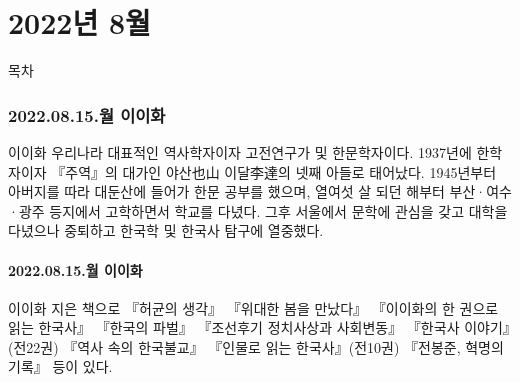\documentclass[aspectratio=1610,17pt,xcolor=pdftex,dvipsnames,table,handout]{beamer}
\begin{document}
		\part{2022년 8월}
		\frame{\partpage}


		\begin{frame} [plain]{목차}
		\tableofcontents
		\end{frame}
		


		\section{2022.08.15.월  이이화 }
		

		\begin{frame} [t,plain]
			\begin{block} {이이화}
우리나라 대표적인 역사학자이자 고전연구가 및 한문학자이다. 1937년에 한학자이자 『주역』의 대가인 야산也山 이달李達의 넷째 아들로 태어났다. 1945년부터 아버지를 따라 대둔산에 들어가 한문 공부를 했으며, 열여섯 살 되던 해부터 부산·여수·광주 등지에서 고학하면서 학교를 다녔다. 그후 서울에서 문학에 관심을 갖고 대학을 다녔으나 중퇴하고 한국학 및 한국사 탐구에 열중했다.
			\end{block}
		\end{frame}

		\subsection{2022.08.15.월  이이화 }
		
		\begin{frame} [t,plain]
			\begin{block} {이이화}
지은 책으로 『허균의 생각』 『위대한 봄을 만났다』 『이이화의 한 권으로 읽는 한국사』 『한국의 파벌』 『조선후기 정치사상과 사회변동』 『한국사 이야기』(전22권) 『역사 속의 한국불교』 『인물로 읽는 한국사』(전10권) 『전봉준, 혁명의 기록』 등이 있다.

			\end{block}
		\end{frame}
\end{document}
